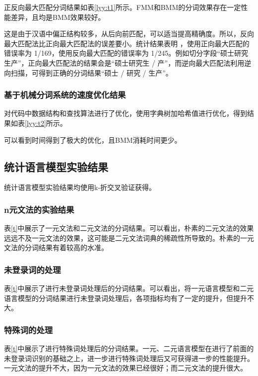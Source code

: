 \documentclass[11pt,a4paper]{article}
\begin{document}
	正反向最大匹配分词结果如表\ref{lyy:t1}所示。FMM和BMM的分词效果存在一定性能差异，且均是BMM效果较好。
	
	这是由于汉语中偏正结构较多，从后向前匹配，可以适当提高精确度。所以，反向最大匹配法比正向最大匹配法的误差要小。统计结果表明 ，使用正向最大匹配的错误率为 1/169，使用反向最大匹配的错误率为 1/245。例如切分字段“硕士研究生产”，正向最大匹配法的结果会是“硕士研究生 / 产”，而逆向最大匹配法利用逆向扫描，可得到正确的分词结果“硕士 / 研究 / 生产”。
	
	\subsubsection{基于机械分词系统的速度优化结果}
	
	对代码中数据结构和查找算法进行了优化，使用字典树加哈希值进行优化，得到结果如表\ref{lyy:t2}所示。
	
	可以看到时间得到了极大的优化，且BMM消耗时间更少。
	
	\subsection{统计语言模型实验结果}
	统计语言模型实验结果均使用k-折交叉验证获得。
	\subsubsection{n元文法的实验结果}
	表\ref{t}中展示了一元文法和二元文法的分词结果。可以看出，朴素的二元文法的效果远远不及一元文法的效果，这可能是二元文法词典的稀疏性所导致的。朴素的一元文法的分词结果有着较高的水准。
	
	\subsubsection{未登录词的处理}
	
	表\ref{t}中展示了进行未登录词处理后的分词结果。可以看出，将一元语言模型和二元语言模型的分词结果进行未登录词处理后，各项指标均有了一定的提升，但提升不大。
	
	\subsubsection{特殊词的处理}
	表\ref{t}中展示了进行特殊词处理后的分词结果。一元、二元语言模型在进行了前面的未登录词识别的基础之上，进一步进行特殊词处理后又可获得进一步的性能提升。一元文法的提升不大，因为一元文法的效果已经很好；而二元文法的提升很大。



	
\end{document}
